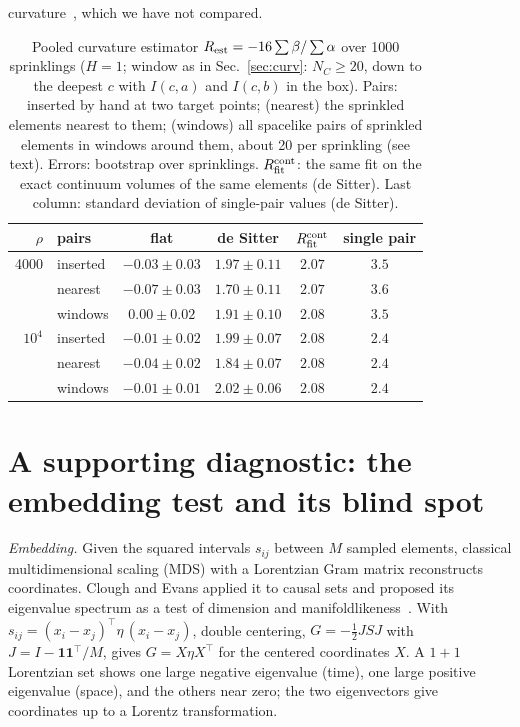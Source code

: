\documentclass[prd,twocolumn,superscriptaddress,nofootinbib,amsmath,amssymb,floatfix]{revtex4-2}
\begin{document}
curvature~\cite{BBR26}, which we have not compared.

\begin{table}[t]
\caption{Pooled curvature estimator $R_{\rm est}=-16\sum\beta/\sum\alpha$ over 1000 sprinklings ($H=1$; window as in Sec.~\ref{sec:curv}: $N_C\geq20$, down to the deepest $c$ with $I(c,a)$ and $I(c,b)$ in the box). Pairs: inserted by hand at two target points; (nearest) the sprinkled elements nearest to them; (windows) all spacelike pairs of sprinkled elements in windows around them, about 20 per sprinkling (see text). Errors: bootstrap over sprinklings. $R_{\rm fit}^{\rm cont}$: the same fit on the exact continuum volumes of the same elements (de Sitter). Last column: standard deviation of single-pair values (de Sitter).}
\label{tab:rest}
\begin{ruledtabular}
\begin{tabular}{rlcccc}
$\rho$ & pairs & flat & de Sitter & $R_{\rm fit}^{\rm cont}$ & single pair\\
\hline
4000 & inserted & $-0.03\pm0.03$ & $1.97\pm0.11$ & $2.07$ & $3.5$\\
 & nearest & $-0.07\pm0.03$ & $1.70\pm0.11$ & $2.07$ & $3.6$\\
 & windows & $0.00\pm0.02$ & $1.91\pm0.10$ & $2.08$ & $3.5$\\
$10^4$ & inserted & $-0.01\pm0.02$ & $1.99\pm0.07$ & $2.08$ & $2.4$\\
 & nearest & $-0.04\pm0.02$ & $1.84\pm0.07$ & $2.08$ & $2.4$\\
 & windows & $-0.01\pm0.01$ & $2.02\pm0.06$ & $2.08$ & $2.4$\\
\end{tabular}
\end{ruledtabular}
\end{table}

\section{A supporting diagnostic: the embedding test and its blind spot}\label{sec:embed}
\emph{Embedding.} Given the squared intervals $s_{ij}$ between $M$ sampled elements, classical multidimensional scaling (MDS) with a Lorentzian Gram matrix reconstructs coordinates. Clough and Evans applied it to causal sets and proposed its eigenvalue spectrum as a test of dimension and manifoldlikeness~\cite{CloughEvans16,Clough17}. With $s_{ij}=(x_i-x_j)^{\top}\eta\,(x_i-x_j)$, double centering, $G=-\tfrac12JSJ$ with $J=I-\mathbf1\mathbf1^{\top}/M$, gives $G=X\eta X^{\top}$ for the centered coordinates $X$. A $1+1$ Lorentzian set shows one large negative eigenvalue (time), one large positive eigenvalue (space), and the others near zero; the two eigenvectors give coordinates up to a Lorentz transformation.
\end{document}
